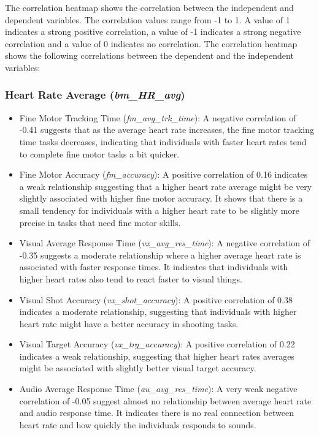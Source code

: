 The correlation heatmap shows the correlation between the independent and dependent variables. The correlation values range from -1 to 1. A value of 1 indicates 
a strong positive correlation, a value of -1 indicates a strong negative correlation and a value of 0 indicates no correlation. The correlation heatmap shows 
the following correlations between the dependent and the independent variables:

\subsubsection*{Heart Rate Average (\textit{bm\_HR\_avg})}
\begin{itemize}
    \item Fine Motor Tracking Time (\textit{fm\_avg\_trk\_time}): A negative correlation of \\ -0.41 suggests that as the average heart rate increases, the fine motor
    tracking time tasks decreases, indicating that individuals with faster heart rates tend to complete fine motor tasks a bit quicker.
    \item Fine Motor Accuracy (\textit{fm\_accuracy}): A positive correlation of 0.16 indicates a weak relationship suggesting that a higher heart rate average might be very 
    slightly associated with higher fine motor accuracy. It shows that there is a small tendency for individuals with a higher heart rate to be slightly more precise
    in tasks that need fine motor skills.
    \item Visual Average Response Time (\textit{vx\_avg\_res\_time}): A negative correlation of -0.35 suggests a moderate relationship where a higher average heart rate
    is associated with faster response times. It indicates that individuals with higher heart rates also tend to react faster to visual things.
    \item Visual Shot Accuracy (\textit{vx\_shot\_accuracy}): A positive correlation of 0.38 indicates a moderate relationship, suggesting that individuals with higher heart
    rate might have a better accuracy in shooting tasks.
    \item Visual Target Accuracy (\textit{vx\_trg\_accuracy}): A positive correlation of 0.22 indicates a weak relationship, suggesting that higher heart rates averages might
    be associated with slightly better visual target accuracy.
    \item Audio Average Response Time (\textit{au\_avg\_res\_time}): A very weak negative correlation of -0.05 suggest almost no relationship between average heart rate
    and audio response time. It indicates there is no real connection between heart rate and how quickly the individuals responds to sounds.
\end{itemize}

